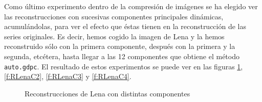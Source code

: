 Como último experimento dentro de la compresión de imágenes se ha elegido ver las reconstrucciones con sucesivas componentes principales dinámicas, acumulándolas, para ver el efecto que éstas tienen en la reconstrucción de las series originales. Es decir, hemos cogido la imagen de Lena y la hemos reconstruido sólo con la primera componente, después con la primera y la segunda, etcétera, hasta llegar a las 12 componentes que obtiene el método \texttt{auto.gdpc}. El resultado de estos experimentos se puede ver en las figuras \ref{f:RLenaC1}, \ref{f:RLenaC2}, \ref{f:RLenaC3} y \ref{f:RLenaC4}.

\begin{figure}[]
 \centering
 \caption{Reconstrucciones de Lena con distintas componentes}
 \label{f:RLenaC1}
\end{figure}

